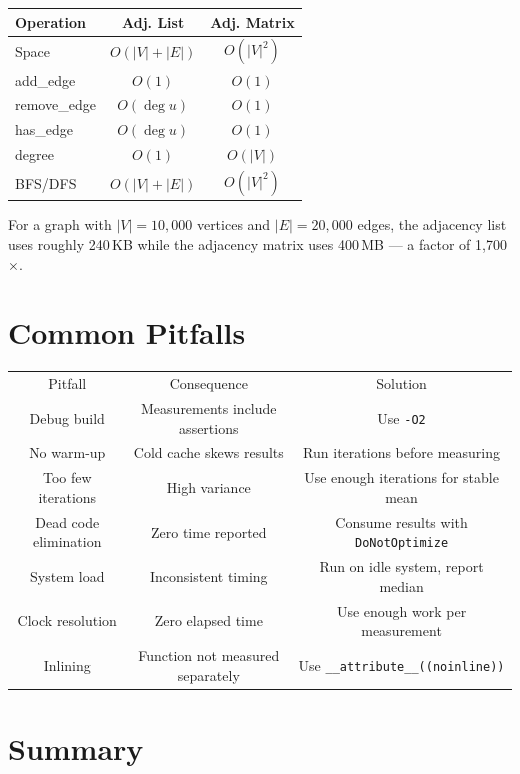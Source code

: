 \begin{center}
\begin{tabular}{lcc}
\toprule
Operation & Adj. List & Adj. Matrix \\
\midrule
Space & $O(|V|+|E|)$ & $O(|V|^2)$ \\
add\_edge & $O(1)$ & $O(1)$ \\
remove\_edge & $O(\deg u)$ & $O(1)$ \\
has\_edge & $O(\deg u)$ & $O(1)$ \\
degree & $O(1)$ & $O(|V|)$ \\
BFS/DFS & $O(|V|+|E|)$ & $O(|V|^2)$ \\
\bottomrule
\end{tabular}
\end{center}

For a graph with $|V| = 10{,}000$ vertices and $|E| = 20{,}000$ edges, the adjacency list uses roughly 240\,KB while the adjacency matrix uses 400\,MB --- a factor of 1{,}700$\times$.

\section{Common Pitfalls}

\begin{center}
\begin{tabular}{ccc}
\toprule
Pitfall & Consequence & Solution \\
Debug build & Measurements include assertions & Use \texttt{-O2} \\
No warm-up & Cold cache skews results & Run iterations before measuring \\
Too few iterations & High variance & Use enough iterations for stable mean \\
Dead code elimination & Zero time reported & Consume results with \texttt{DoNotOptimize} \\
System load & Inconsistent timing & Run on idle system, report median \\
Clock resolution & Zero elapsed time & Use enough work per measurement \\
Inlining & Function not measured separately & Use \texttt{\_\_attribute\_\_((noinline))} \\

\bottomrule
\end{tabular}
\end{center}
\section{Summary}

